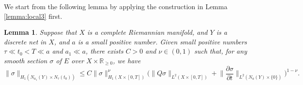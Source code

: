\documentclass[12pt, reqno]{amsart}
\theoremstyle{plain}%
\newtheorem{lemma}[theorem]{Lemma}
\theoremstyle{definition}
\theoremstyle{remark}
\numberwithin{equation}{section}
\newcommand{\R}{\mathbb{R}}
\begin{document}
We start from the following lemma by applying the construction in Lemma \ref{lemma:local3} first.
\begin{lemma}\label{lemma:interpolation1}
	Suppose that $X$ is a complete Riemannian manifold, and $Y$ is a discrete net in $X$, and $a$ is a small positive number. Given small positive numbers  $\tau \ll t_0<T\ll a$ and $a_1\ll a$, there exists $C>0$ and $\nu\in(0,1)$ such that,  for any smooth section $\sigma$ of $E$ over $X\times\R_{\geq 0}$, we have
		\begin{equation*}
		\|\sigma\|_{H_1(N_{a_1}(Y)\times N_\tau(t_0))}\leq C \|\sigma\|_{H_1(X\times[0,T])}^\nu\Big(\|Q\sigma\|_{L^2(X\times[0,T])}+\Big\|\frac{\partial \sigma}{\partial t}\Big\|_{L^2(N_a(Y)\times\{0\})}\Big)^{1-\nu}.
	\end{equation*}
\end{lemma}
\end{document}
